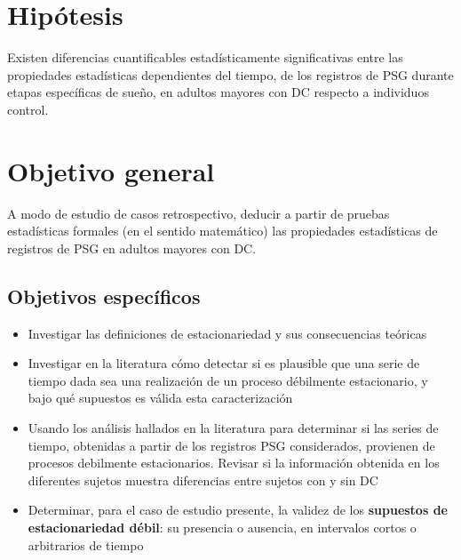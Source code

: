 \section{Hip\'otesis}

Existen diferencias cuantificables estad\'isticamente significativas entre las propiedades
estad\'isticas dependientes del tiempo, de los registros de PSG
durante etapas espec\'ificas de sue\~no, en adultos
mayores con DC respecto a individuos control.


\section{Objetivo general}

A modo de estudio de casos retrospectivo,
deducir a partir de pruebas estad\'isticas formales (en el sentido matem\'atico) las propiedades
estad\'isticas de registros de PSG en adultos mayores con DC.


\subsection{Objetivos espec\'ificos}

\begin{itemize}
\item Investigar las definiciones de estacionariedad y sus consecuencias te\'oricas

\item Investigar en la literatura c\'omo detectar si es plausible que una serie de tiempo 
dada sea una realizaci\'on de un proceso d\'ebilmente estacionario, 
y bajo qu\'e supuestos es v\'alida esta caracterizaci\'on

\item Usando los an\'alisis hallados en la literatura para determinar si las series de tiempo,
obtenidas a partir de los registros PSG considerados, provienen de procesos
debilmente estacionarios.
Revisar si la informaci\'on obtenida en los diferentes sujetos muestra diferencias entre
sujetos con y sin DC

\item Determinar, para el caso de estudio presente, la validez de los \textbf{supuestos de 
estacionariedad d\'ebil}: su presencia o ausencia, en intervalos cortos o arbitrarios de tiempo
\end{itemize}

